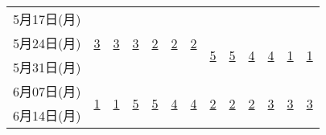 \documentclass[12pt]{jarticle}
\begin{document}
\begin{table}[htb]
\begin{center}
\begin{tabular}{|l||c|c|c|c|c|c||c|c|c|c|c|c|}
            5月17日(月) & \multirow{3}{*}{{\underline{3}}}                             & \multirow{3}{*}{{\underline{3}}} & \multirow{3}{*}{{\underline{3}}} & \multirow{3}{*}{{\underline{2}}} & \multirow{3}{*}{{\underline{2}}} & \multirow{3}{*}{{\underline{2}}} &                                  &                                  &                                  &                                  &                                  &                                  \\ \cline{8-13}
            5月24日(月) &                                                              &                                  &                                  &                                  &                                  &                                  & \multirow{2}{*}{{\underline{5}}} & \multirow{2}{*}{{\underline{5}}} & \multirow{2}{*}{{\underline{4}}} & \multirow{2}{*}{{\underline{4}}} & \multirow{2}{*}{{\underline{1}}} & \multirow{2}{*}{{\underline{1}}} \\
            5月31日(月) &                                                              &                                  &                                  &                                  &                                  &                                  &                                  &                                  &                                  &                                  &                                  &                                  \\ \hline \hline
            6月07日(月) & \multirow{2}{*}{{\underline{1}}}                             & \multirow{2}{*}{{\underline{1}}} & \multirow{2}{*}{{\underline{5}}} & \multirow{2}{*}{{\underline{5}}} & \multirow{2}{*}{{\underline{4}}} & \multirow{2}{*}{{\underline{4}}} & \multirow{3}{*}{{\underline{2}}} & \multirow{3}{*}{{\underline{2}}} & \multirow{3}{*}{{\underline{2}}} & \multirow{3}{*}{{\underline{3}}} & \multirow{3}{*}{{\underline{3}}} & \multirow{3}{*}{{\underline{3}}} \\
            6月14日(月) &                                                              &                                  &                                  &                                  &                                  &                                  &                                  &                                  &                                  &                                  &                                  &                                  \\ \cline{2-7}

\end{tabular}
\end{center}
\end{table}
\end{document}
